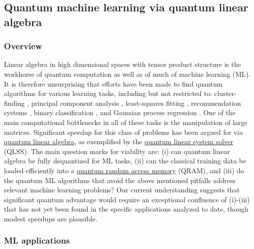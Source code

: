 \newpage

\begin{refsection}

\subsection{Quantum machine learning via quantum linear algebra}
\label{appl:QMLfromLinAlg}



\subsubsection*{Overview}
Linear algebra in high dimensional spaces with tensor product structure is the workhorse of quantum computation as well as of much of machine learning (ML).
It is therefore unsurprising that efforts have been made to find quantum algorithms for various learning tasks, including but not restricted to: cluster-finding \cite{lloyd2013quantum}, principal component analysis \cite{lloyd2013QPrincipalCompAnal}, least-squares fitting \cite{schuld2016prediction,kerenidis2017QGradDesc}, recommendation systems \cite{kerenidis2016QRecSys}, binary classification \cite{rebentrost2014QSVM}, and Gaussian process regression \cite{zhao2015QAssisstedGaussProcRegr}. One of the main computational bottlenecks in all of these tasks is the manipulation of large matrices. Significant speedup for this class of problems has been argued for via \hyperref[prim:LinearAlgebra]{quantum linear algebra}, as exemplified by the \hyperref[prim:QuantumLinearSystemSolvers]{quantum linear system solver} (QLSS). The main question marks for viability are: (i) can quantum linear algebra be fully dequantized \cite{tang2018QInspiredClassAlgPCA} for ML tasks, (ii) can the classical training data be loaded efficiently into a \hyperref[prim:QRAM]{quantum random access memory} (QRAM), and (iii) do the  quantum ML algorithms that avoid the above mentioned pitfalls address relevant machine learning problems? Our current understanding suggests that significant quantum advantage would require an exceptional confluence of (i)-(iii) that has not yet been found in the specific applications analyzed to date, though modest speedups are plausible. 

\subsubsection*{ML applications}


\end{refsection}
